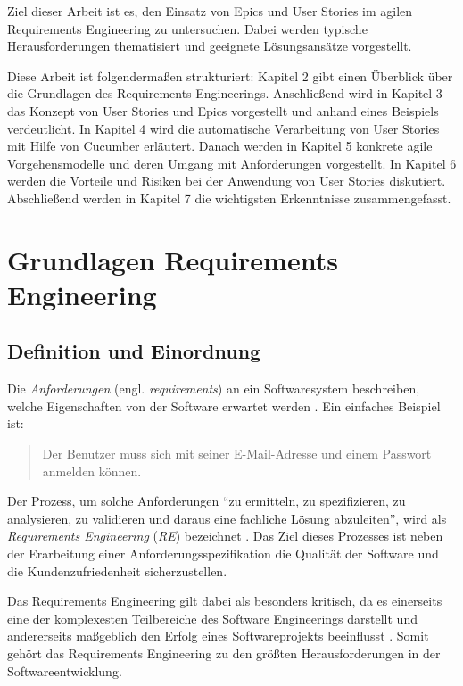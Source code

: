 \documentclass[acmtog]{acmart}
\begin{document}
Ziel dieser Arbeit ist es, den Einsatz von Epics und User Stories im agilen Requirements Engineering zu untersuchen. Dabei werden typische Herausforderungen thematisiert und geeignete Lösungsansätze vorgestellt.

Diese Arbeit ist folgendermaßen strukturiert:
Kapitel 2 gibt einen Überblick über die Grundlagen des Requirements Engineerings.
Anschließend wird in Kapitel 3 das Konzept von User Stories und Epics vorgestellt und anhand eines Beispiels verdeutlicht.
In Kapitel 4 wird die automatische Verarbeitung von User Stories mit Hilfe von Cucumber erläutert.
Danach werden in Kapitel 5 konkrete agile Vorgehensmodelle und deren Umgang mit Anforderungen vorgestellt.
In Kapitel 6 werden die Vorteile und Risiken bei der Anwendung von User Stories diskutiert.
Abschließend werden in Kapitel 7 die wichtigsten Erkenntnisse zusammengefasst.

\section{Grundlagen Requirements Engineering}

\subsection{Definition und Einordnung}
Die \emph{Anforderungen} (engl. \textit{requirements}) an ein Softwaresystem beschreiben, welche Eigenschaften von der Software erwartet werden \cite{sommerville16}.
Ein einfaches Beispiel ist:
\begin{quote}
	Der Benutzer muss sich mit seiner E-Mail-Adresse und einem Passwort anmelden können.
\end{quote}

Der Prozess, um solche Anforderungen ``zu ermitteln, zu spezifizieren, zu analysieren, zu validieren und daraus eine fachliche Lösung abzuleiten'', wird als \emph{Requirements Engineering} (\emph{RE}) bezeichnet \cite{balzert09}.
Das Ziel dieses Prozesses ist neben der Erarbeitung einer Anforderungsspezifikation die Qualität der Software und die Kundenzufriedenheit sicherzustellen.

Das Requirements Engineering gilt dabei als besonders kritisch, da es einerseits eine der komplexesten Teilbereiche des Software Engineerings darstellt und andererseits maßgeblich den Erfolg eines Softwareprojekts beeinflusst \cite{balzert09}.
Somit gehört das Requirements Engineering zu den größten Herausforderungen in der Softwareentwicklung.
\end{document}
